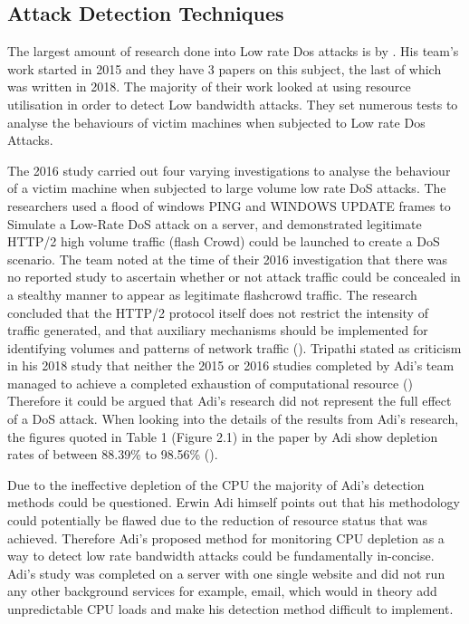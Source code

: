 \subsection{Attack Detection Techniques}

The largest amount of research done into Low rate Dos attacks is by \citeauthor{Adi2015}. His team's work started in 2015 and they have 3 papers on this subject, the last of which was written in 2018. The majority of their work looked at using resource utilisation in order to detect Low bandwidth attacks. They set numerous tests to analyse the behaviours of victim machines when subjected to Low rate Dos Attacks. 

The 2016 study carried out four varying investigations to analyse the behaviour of a victim machine when subjected to large volume low rate DoS attacks. The researchers used a flood of windows PING and WINDOWS UPDATE frames to Simulate a Low-Rate DoS attack on a server, and demonstrated legitimate HTTP/2 high volume traffic (flash Crowd) could be launched to create a DoS scenario. The team noted at the time of their 2016 investigation that there was no reported study to ascertain whether or not attack traffic could be concealed in a stealthy manner to appear as legitimate flashcrowd traffic. The research concluded that the HTTP/2 protocol itself does not restrict the intensity of traffic generated, and that auxiliary mechanisms should be implemented for identifying volumes and patterns of network traffic  (\cite{Adi2016}). Tripathi stated as criticism in his 2018 study that neither the 2015 or 2016 studies completed by Adi's team managed to achieve a completed exhaustion of computational resource (\cite{tripathi2018slow}) Therefore it could be argued that Adi's research did not represent the full effect of a DoS attack. When looking into the details of the results from Adi's research, the figures quoted in Table 1 (Figure 2.1) in the paper by Adi show depletion rates of between 88.39\% to 98.56\% (\cite{Adi2016}).

Due to the ineffective depletion of the CPU the majority of Adi's detection methods could be questioned. Erwin Adi himself points out that his methodology could potentially be flawed due to the reduction of resource status that was achieved. Therefore Adi's proposed method for monitoring CPU depletion as a way to detect low rate bandwidth attacks could be fundamentally in-concise. Adi's study was completed on a server with one single website and did not run any other background services for example, email, which would in theory add unpredictable CPU loads and make his detection method difficult to implement.

